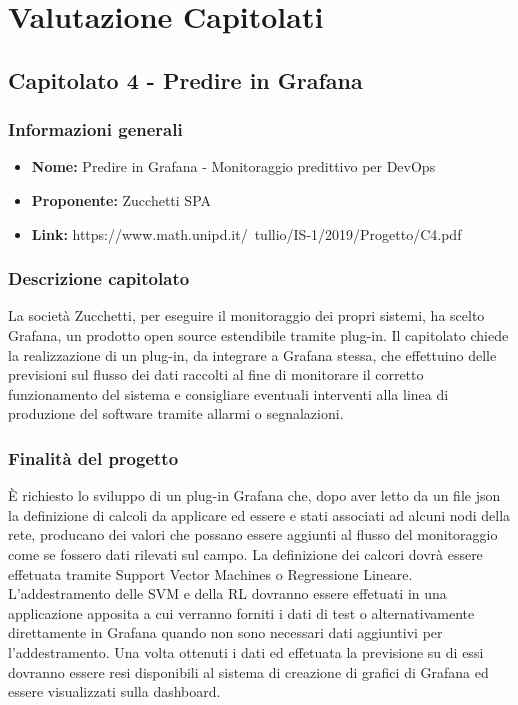 \section{Valutazione Capitolati}

\subsection{Capitolato 4 - Predire in Grafana}

		\subsubsection{Informazioni generali}
			\begin{itemize} %
			  \item \textbf{Nome:} Predire in Grafana - Monitoraggio predittivo per DevOps
			  \item \textbf{Proponente:} Zucchetti SPA
			  \item \textbf{Link:} https://www.math.unipd.it/~tullio/IS-1/2019/Progetto/C4.pdf
			\end{itemize}
		
		\subsubsection{Descrizione capitolato}
			La società Zucchetti, per eseguire il monitoraggio dei propri sistemi, ha scelto Grafana, un prodotto open source estendibile tramite plug-in.
			Il capitolato chiede la realizzazione di un plug-in, da integrare a Grafana stessa, che effettuino delle previsioni sul flusso dei dati raccolti al fine di monitorare il corretto funzionamento del sistema e consigliare eventuali interventi alla linea di produzione del software tramite allarmi o segnalazioni.
		
		\subsubsection{Finalità del progetto}
			È richiesto lo sviluppo di un plug-in Grafana che, dopo aver letto da un file json la definizione di calcoli da applicare ed essere e stati associati ad alcuni nodi della rete, producano dei valori che possano essere aggiunti al flusso del monitoraggio come se fossero dati rilevati sul campo.
			La definizione dei calcori dovrà essere effetuata tramite Support Vector Machines o Regressione Lineare. L’addestramento delle SVM e della RL dovranno essere effetuati in una applicazione apposita a cui verranno forniti i dati di test o alternativamente direttamente in Grafana quando non sono necessari dati aggiuntivi per l’addestramento.
			Una volta ottenuti i dati ed effetuata la previsione su di essi dovranno essere resi disponibili al sistema di creazione di grafici di Grafana ed essere visualizzati sulla dashboard.
		
